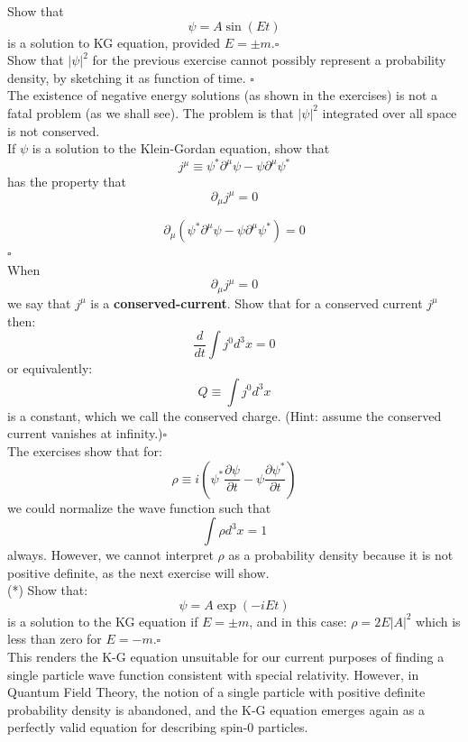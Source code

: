 \documentclass[12pt]{article}
\begin{document}
\exercise Show that
$$\psi = A \sin\left(E t\right) $$
is a solution to KG equation, provided $E = \pm m$.$\square$\\[5pt]

\exercise Show that $|\psi|^2$ for the previous exercise cannot
possibly represent a probability density, by sketching it as function of time.
$\square$\\[5pt]

The existence of negative energy solutions (as shown in the exercises)
is not a fatal problem (as we shall see).  The problem is that
$|\psi|^2$ integrated over all space is not conserved.\\[5pt]

\exercise If $\psi$ is a solution to the Klein-Gordan equation, show that
$$j^\mu \equiv \psi^* \partial^\mu \psi - \psi \partial^\mu \psi^*$$
has the property that
$$\partial_\mu j^\mu = 0$$

$$\partial_\mu(\psi^* \partial^\mu \psi - \psi \partial^\mu \psi^*) = 0$$
$\square$\\[5pt]

\exercise When
$$\partial_\mu j^\mu = 0$$
we say that $j^\mu$ is a {\bf conserved-current}.  Show that for a conserved current $j^\mu$
then:
$$\frac{d}{dt} \int j^0 d^3 x = 0$$
or equivalently:
$$Q \equiv \int j^0 d^3 x$$
is a constant, which we call the conserved charge.  (Hint: assume the conserved current vanishes at infinity.)$\square$\\[5pt]

The exercises show that for:
$$\rho \equiv i \left( \psi^* \frac{\partial \psi}{\partial t} - \psi \frac{\partial \psi^*}{\partial t} \right)$$
we could normalize the wave function such that
$$\int \rho d^3x = 1$$
always.  However, we cannot interpret $\rho$ as a probability density
because it is not positive definite, as the next exercise will show.\\[5pt]

\exercise (*) Show that:
$$\psi = A \exp(-i E t)$$
is a solution to the KG equation if $E = \pm m$, and in this case:
$\rho = 2E |A|^2$
which is less than zero for $E = -m$.$\square$\\[5pt]

This renders the K-G equation unsuitable for our current purposes of
finding a single particle wave function consistent with special
relativity.  However, in Quantum Field Theory, the notion of a single
particle with positive definite probability density is abandoned, and
the K-G equation emerges again as a perfectly valid equation for
describing spin-0 particles.
\end{document}
